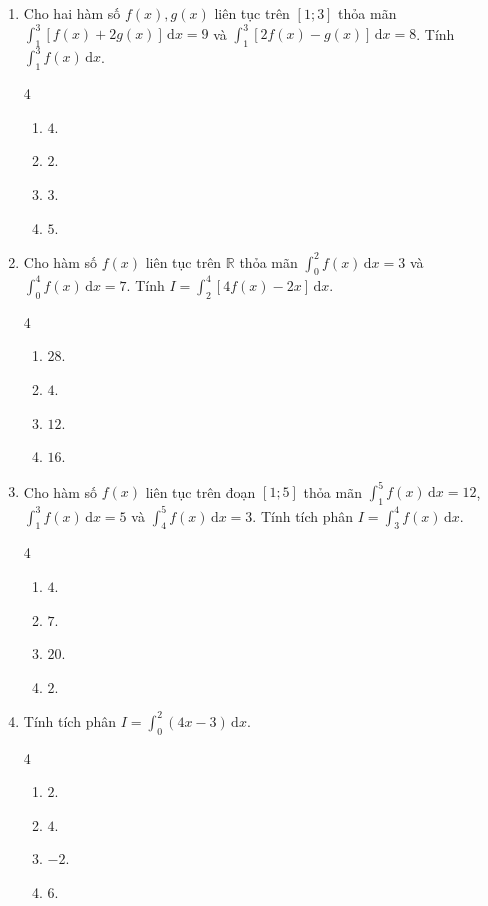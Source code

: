 \documentclass[12pt]{article}
\begin{document}
\begin{enumerate}[label=\textbf{Câu \arabic*.}]
		\item Cho hai hàm số $f(x), g(x)$ liên tục trên $[1; 3]$ thỏa mãn $\displaystyle \int_1^3 [f(x) + 2g(x)]\,\mathrm{d}x = 9$ và $\displaystyle \int_1^3 [2f(x) - g(x)]\,\mathrm{d}x = 8$. Tính $\displaystyle \int_1^3 f(x)\,\mathrm{d}x$.
		\begin{multicols}{4}
			\begin{enumerate}[label=\textbf{\Alph*.}]
				\item $4$.
				\item $2$.
				\item $3$.
				\item $5$.
			\end{enumerate}
		\end{multicols}
		
		\item Cho hàm số $f(x)$ liên tục trên $\mathbb{R}$ thỏa mãn $\displaystyle \int_0^2 f(x)\,\mathrm{d}x = 3$ và $\displaystyle \int_0^4 f(x)\,\mathrm{d}x = 7$. Tính $I = \displaystyle \int_2^4 [4f(x) - 2x]\,\mathrm{d}x$.
		\begin{multicols}{4}
			\begin{enumerate}[label=\textbf{\Alph*.}]
				\item $28$.
				\item $4$.
				\item $12$.
				\item $16$.
			\end{enumerate}
		\end{multicols}
		
		\item Cho hàm số $f(x)$ liên tục trên đoạn $[1; 5]$ thỏa mãn $\displaystyle \int_1^5 f(x)\,\mathrm{d}x = 12$, $\displaystyle \int_1^3 f(x)\,\mathrm{d}x = 5$ và $\displaystyle \int_4^5 f(x)\,\mathrm{d}x = 3$. Tính tích phân $I = \displaystyle \int_3^4 f(x)\,\mathrm{d}x$.
		\begin{multicols}{4}
			\begin{enumerate}[label=\textbf{\Alph*.}]
				\item $4$.
				\item $7$.
				\item $20$.
				\item $2$.
			\end{enumerate}
		\end{multicols}
		\item Tính tích phân $I = \displaystyle \int_0^2 (4x - 3)\,\mathrm{d}x$.
		\begin{multicols}{4}
			\begin{enumerate}[label=\textbf{\Alph*.}]
				\item $2$.
				\item $4$.
				\item $-2$.
				\item $6$.
			\end{enumerate}
		\end{multicols}
		

\end{enumerate}
\end{document}
